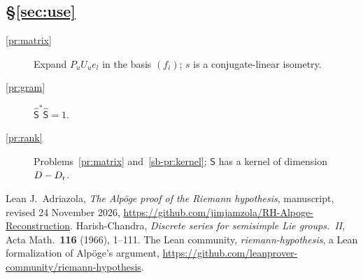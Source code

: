 \documentclass[reqno]{amsart}
\theoremstyle{definition}
\theoremstyle{plain}
\theoremstyle{remark}
\begin{document}
\subsection*{\S\ref{sec:use}}
\begin{description}
\item[\ref{pr:matrix}] Expand \(P_uU_ue_l\) in the basis \((f_i)\); \(s\) is a conjugate-linear isometry.
\item[\ref{pr:gram}] \(\hat{\mathsf S}^*\hat{\mathsf S}=1\).
\item[\ref{pr:rank}] Problems~\ref{pr:matrix} and~\ref{sb-pr:kernel}; \(\mathsf S\) has a kernel of dimension \(D-D_{\rm r}\).
\end{description}

\begin{thebibliography}{Lean}
 J.~Adriazola, \emph{The Alp\"oge proof of the Riemann hypothesis}, manuscript, revised 24 November 2026, \url{https://github.com/jimjamzola/RH-Alpoge-Reconstruction}.
 Harish-Chandra, \emph{Discrete series for semisimple Lie groups.~II}, Acta Math.\ \textbf{116} (1966), 1--111.
 The Lean community, \emph{riemann-hypothesis}, a Lean formalization of Alp\"oge's argument, \url{https://github.com/leanprover-community/riemann-hypothesis}.
\end{thebibliography}
\end{document}
